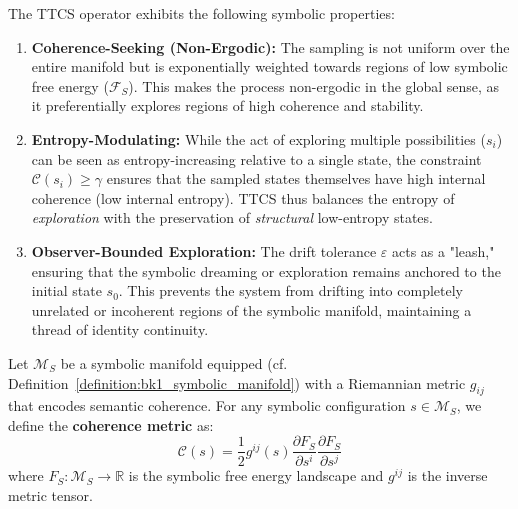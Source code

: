 \begin{lemma}
\label{lemma:bk4_properties_of_ttcs}
The TTCS operator exhibits the following symbolic properties:
\begin{enumerate}
    \item \textbf{Coherence-Seeking (Non-Ergodic):} The sampling is not uniform over the entire manifold but is exponentially weighted towards regions of low symbolic free energy ($\mathcal{F}_S$). This makes the process non-ergodic in the global sense, as it preferentially explores regions of high coherence and stability.
    \item \textbf{Entropy-Modulating:} While the act of exploring multiple possibilities ($s_i$) can be seen as entropy-increasing relative to a single state, the constraint $\mathcal{C}(s_i) \geq \gamma$ ensures that the sampled states themselves have high internal coherence (low internal entropy). TTCS thus balances the entropy of \emph{exploration} with the preservation of \emph{structural} low-entropy states.
    \item \textbf{Observer-Bounded Exploration:} The drift tolerance $\varepsilon$ acts as a "leash," ensuring that the symbolic dreaming or exploration remains anchored to the initial state $s_0$. This prevents the system from drifting into completely unrelated or incoherent regions of the symbolic manifold, maintaining a thread of identity continuity.
\end{enumerate}
\end{lemma}

\begin{definition}
\label{def:bk4_coherence_metric_on_symbolic_manifold}
Let $\mathcal{M}_S$ be a symbolic manifold equipped (cf. Definition~\ref{definition:bk1_symbolic_manifold}) with a Riemannian metric $g_{ij}$ that encodes semantic coherence. For any symbolic configuration $s \in \mathcal{M}_S$, we define the \textbf{coherence metric} as:
\[
\mathcal{C}(s) = \frac{1}{2} g^{ij}(s) \frac{\partial F_S}{\partial s^i} \frac{\partial F_S}{\partial s^j}
\]
where $F_S: \mathcal{M}_S \to \mathbb{R}$ is the symbolic free energy landscape and $g^{ij}$ is the inverse metric tensor.
\end{definition}

